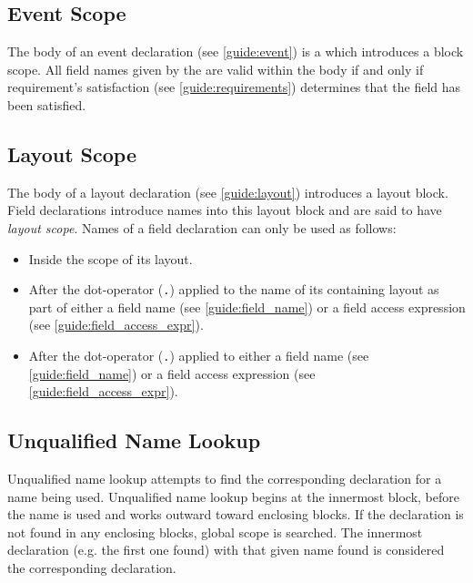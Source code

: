 \subsection{Event Scope} \label{guide:event_scope}

The body of an event declaration (see \ref{guide:event}) is a  which introduces a block scope. All field names given by the  are valid within the body if and only if requirement's satisfaction (see \ref{guide:requirements}) determines that the field has been satisfied.

\subsection{Layout Scope} \label{guide:layout_scope}

The body of a layout declaration (see \ref{guide:layout}) introduces a layout block. Field declarations introduce names into this layout block and are said to have \textit{layout scope}. Names of a field declaration can only be used as follows:

\begin{itemize}
\item Inside the scope of its layout.

\item After the dot-operator (\texttt{.}) applied to the name of its containing layout as part of either a field name (see \ref{guide:field_name}) or a field access expression (see \ref{guide:field_access_expr}).

\item After the dot-operator (\texttt{.}) applied to either a field name (see \ref{guide:field_name}) or a field access expression (see \ref{guide:field_access_expr}).
\end{itemize}

\subsection{Unqualified Name Lookup} \label{guide:unqlfd_lookup}

Unqualified name lookup attempts to find the corresponding declaration for a name being used. Unqualified name lookup begins at the innermost block, before the name is used and works outward toward enclosing blocks. If the declaration is not found in any enclosing blocks, global scope is searched. The innermost declaration (e.g. the first one found) with that given name found is considered the corresponding declaration.

